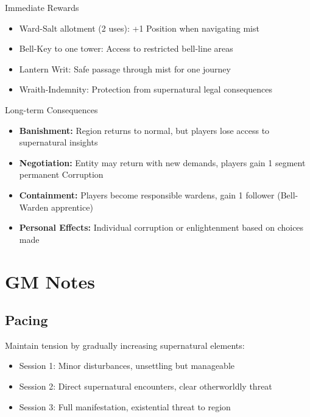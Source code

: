 \documentclass[11pt]{article}
\begin{document}
\begin{mechanicsbox}{Immediate Rewards}
\begin{itemize}
    \item Ward-Salt allotment (2 uses): +1 Position when navigating mist
    \item Bell-Key to one tower: Access to restricted bell-line areas
    \item Lantern Writ: Safe passage through mist for one journey
    \item Wraith-Indemnity: Protection from supernatural legal consequences
\end{itemize}
\end{mechanicsbox}

\begin{mechanicsbox}{Long-term Consequences}
\begin{itemize}
    \item \textbf{Banishment:} Region returns to normal, but players lose access to supernatural insights
    \item \textbf{Negotiation:} Entity may return with new demands, players gain 1 segment permanent Corruption
    \item \textbf{Containment:} Players become responsible wardens, gain 1 follower (Bell-Warden apprentice)
    \item \textbf{Personal Effects:} Individual corruption or enlightenment based on choices made
\end{itemize}
\end{mechanicsbox}

\section*{GM Notes}

\subsection*{Pacing}
Maintain tension by gradually increasing supernatural elements:
\begin{itemize}
    \item Session 1: Minor disturbances, unsettling but manageable
    \item Session 2: Direct supernatural encounters, clear otherworldly threat
    \item Session 3: Full manifestation, existential threat to region
\end{itemize}
\end{document}
